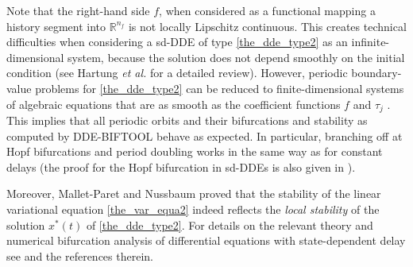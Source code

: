 \documentclass[10pt]{scrartcl}
\newcommand{\DDEBIFCODE}{\textsc{DDE-BIFTOOL}}
\newcommand{\RR}{\mathbb{R}}
\begin{document}
Note that the right-hand side $f$, when considered as a functional
mapping a history segment into $\RR^{n_f}$ is not locally Lipschitz
continuous. This creates technical difficulties when considering a
sd-DDE of type \eqref{the_dde_type2} as an infinite-dimensional
system, because the solution does not depend smoothly on the
initial condition (see Hartung \emph{et al. }\cite{HKWW06} for a
detailed review). However, periodic boundary-value problems for
\eqref{the_dde_type2} can be reduced to finite-dimensional systems of
algebraic equations that are as smooth as the coefficient functions
$f$ and $\tau_j$ \cite{S12}. This implies that all periodic orbits and
their bifurcations and stability as computed by \DDEBIFCODE{} behave as
expected. In particular, branching off at Hopf bifurcations and period
doubling works in the same way as for constant delays (the proof for the Hopf
bifurcation in sd-DDEs is also given in \cite{S12}).


Moreover, Mallet-Paret and Nussbaum \cite{MN11} proved that the
stability of the linear variational equation \eqref{the_var_equa2}
indeed reflects the {\normalfont\itshape local stability} of the solution
$x^*(t)$ of \cref{the_dde_type2}. 
For details on the relevant theory and numerical bifurcation analysis
of differential equations with state-dependent delay see
\cite{luz01,HKWW06,S17} and the references therein.
\end{document}
